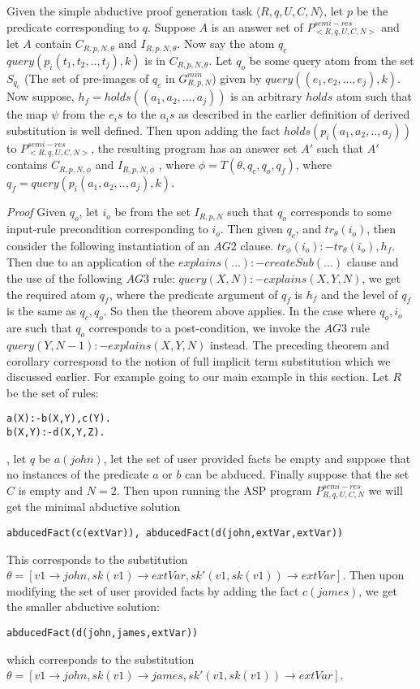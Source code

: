  
\begin{corollary}\label{addfact}
Given the simple abductive proof generation task $\langle R,q,U,C,N\rangle$, let $p$ be the predicate corresponding to $q$. Suppose $A$ is an answer set of $P^{semi-res}_{<R,q,U,C,N>}$ and let $A$ contain $C_{R,p,N,\theta}$ and $I_{R,p,N,\theta}$. Now say the atom $q_{c}$ $query(p_{i}(t_{1},t_{2},..,t_{j}),k)$ is in $C_{R,p,N,\theta}$. Let $q_{o}$ be some query atom from the set $S_{q_{c}}$ (The set of pre-images of $q_{c}$ in $G_{R,p,N}^{min}$) given by $query((e_{1},e_{2},...,e_{j}),k)$. Now suppose, $h_{f}= holds((a_{1},a_{2},...,a_{j}))$ is an arbitrary $holds$ atom such that the map $\psi$ from the $e_{i}s$ to the $a_{i}s$ as described in the earlier definition of derived substitution is well defined. Then upon adding the fact $holds(p_{i}(a_{1},a_{2},..,a_{j}))$ to $P^{semi-res}_{<R,q,U,C,N>}$, the resulting program has an answer set $A'$ such that $A'$ contains $C_{R,p,N,\phi}$ and $I_{R,p,N,\phi}$ , where $\phi = T(\theta, q_{c}, q_{o}, q_{f})$, where $q_{f} = query(p_{i}(a_{1},a_{2},..,a_{j}),k)$. 
\end{corollary}
\textit{Proof} Given $q_{o}$, let $i_{o}$ be from the set $I_{R,p,N}$ such that $q_{o}$ corresponds to some input-rule precondition corresponding to $i_{o}$. Then given $q_{c}$, and $tr_{\theta}(i_{o})$, then consider the following instantiation of an $AG2$ clause. $tr_{\phi}(i_{o}):-tr_{\theta}(i_{o}),h_{f}$. Then due to an application of the $explains(...):-createSub(...)$ clause and the use of the following $AG3$ rule:
$query(X,N):-explains(X,Y,N)$, we get the required atom $q_{f}$, where the
predicate argument of $q_{f}$ is $h_{f}$ and the level of $q_{f}$ is the same as
$q_{c},q_{o}$. So then the theorem above applies. In the case where $q_{o},
i_{o}$ are such that $q_{o}$ corresponds to a post-condition, we invoke the
$AG3$ rule $query(Y,N-1):-explains(X,Y,N)$ instead.
The preceding theorem and corollary correspond to the notion of full implicit term substitution which we discussed earlier. For example going to our main example in this section. Let $R$ be the set of rules:\begin{lstlisting}[frame=none]
a(X):-b(X,Y),c(Y).
b(X,Y):-d(X,Y,Z).
\end{lstlisting}, let $q$ be $a(john)$, let the set of user provided facts be empty and suppose that no instances of the predicate $a$ or $b$ can be abduced. Finally suppose that the set $C$ is empty and $N=2$. Then upon running the ASP program $P_{R,q,U,C,N}^{semi-res}$ we will get the minimal abductive solution \begin{lstlisting}[frame=none]
abducedFact(c(extVar)), abducedFact(d(john,extVar,extVar))
\end{lstlisting} 
This corresponds to the substitution $\theta =[v1\rightarrow john,sk(v1) \rightarrow extVar, sk'(v1,sk(v1))\rightarrow extVar]$. Then upon modifying the set of user provided facts by adding the fact $c(james)$, we get the smaller abductive solution:
\begin{lstlisting}[frame=none]
abducedFact(d(john,james,extVar))
\end{lstlisting} which corresponds to the substitution $\theta =[v1\rightarrow john,sk(v1) \rightarrow james, sk'(v1,sk(v1))\rightarrow extVar]$. 
